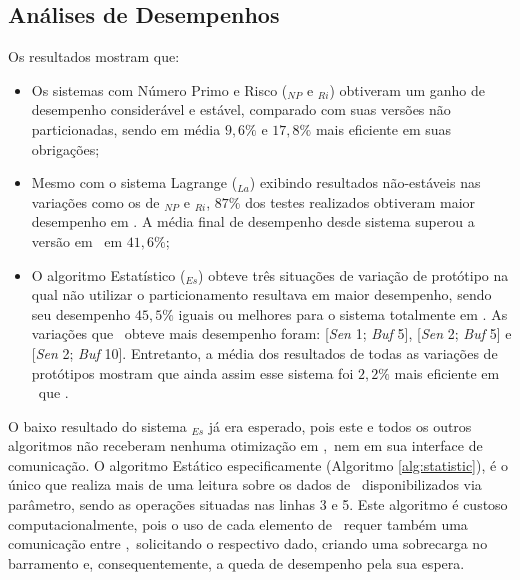         \subsection{Análises de Desempenhos}
        Os resultados mostram que:
        \begin{itemize}
            \item 
            Os sistemas com Número Primo e Risco (\Ss$_{NP}$ e \Ss$_{Ri}$) obtiveram um ganho de desempenho considerável e estável, comparado com suas versões não particionadas, sendo em média $9,6\%$ e $17,8\%$ mais eficiente em suas obrigações;
            
            \item 
            Mesmo com o sistema Lagrange (\Ss$_{La}$) exibindo resultados não-estáveis nas variações como os de \Ss$_{NP}$ e \Ss$_{Ri}$, $87\%$ dos testes realizados obtiveram maior desempenho em \hardware.
            A média final de desempenho desde sistema superou a versão em \software\ em $41,6\%$;
            
            \item 
            O algoritmo Estatístico (\Ss$_{Es}$) obteve três situações de variação de protótipo na qual não utilizar o particionamento resultava em maior desempenho, sendo seu desempenho $45,5\%$ iguais ou melhores para o sistema totalmente em \software.
            As variações que \software\ obteve mais desempenho foram: [\textit{Sen} 1; \textit{Buf} 5], [\textit{Sen} 2; \textit{Buf} 5] e [\textit{Sen} 2; \textit{Buf} 10]. 
            Entretanto, a média dos resultados de todas as variações de protótipos mostram que ainda assim esse sistema foi $2,2\%$ mais eficiente em \hardware\ que \software.
        \end{itemize}
    
    
        O baixo resultado do sistema \Ss$_{Es}$ já era esperado, pois este e todos os outros algoritmos não receberam nenhuma otimização em \hardware,\ nem em sua interface de comunicação.
        O algoritmo Estático especificamente (Algoritmo \ref{alg:statistic}), é o único que realiza mais de uma leitura sobre os dados de \buffer\ disponibilizados via parâmetro, sendo as operações situadas nas linhas 3 e 5.
        Este algoritmo é custoso computacionalmente, pois o uso de cada elemento de \buffer\ requer também uma comunicação entre \hs,\ solicitando o respectivo dado, criando uma sobrecarga no barramento e, consequentemente, a queda de desempenho pela sua espera.
        
